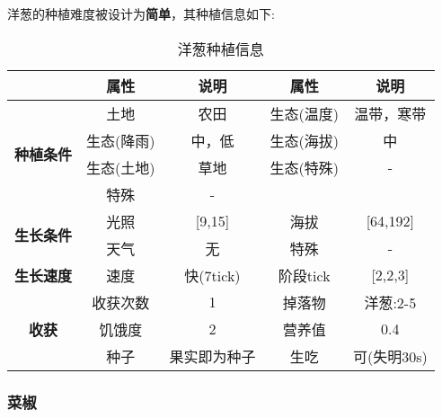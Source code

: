 洋葱的种植难度被设计为\textbf{简单}，其种植信息如下:

\begin{table}[H]
    \centering
    \caption{洋葱种植信息}
    \label{table:洋葱种植信息}
    \setlength{\tabcolsep}{4mm}
    \begin{tabular}{c|cc|cc}
        \toprule
                                           & \textbf{属性} & \textbf{说明} & \textbf{属性} & \textbf{说明} \\
        \midrule
        \multirow{4}{*}{\textbf{种植条件}} & 土地          & 农田          & 生态(温度)    & 温带，寒带    \\
                                           & 生态(降雨)    & 中，低        & 生态(海拔)    & 中            \\
                                           & 生态(土地)    & 草地          & 生态(特殊)    & -             \\
                                           & 特殊          & -                                             \\
        \midrule
        \multirow{2}{*}{\textbf{生长条件}} & 光照          & [9,15]        & 海拔          & [64,192]      \\
                                           & 天气          & 无            & 特殊          & -             \\
        \midrule
        \textbf{生长速度}                  & 速度          & 快(7tick)     & 阶段tick      & [2,2,3]       \\
        \midrule
        \multirow{3}{*}{\textbf{收获}}     & 收获次数      & 1             & 掉落物        & 洋葱:2-5      \\
                                           & 饥饿度        & 2             & 营养值        & 0.4           \\
                                           & 种子          & 果实即为种子  & 生吃          & 可(失明30s)   \\
        \bottomrule
    \end{tabular}
\end{table}

\subsubsection{菜椒}

